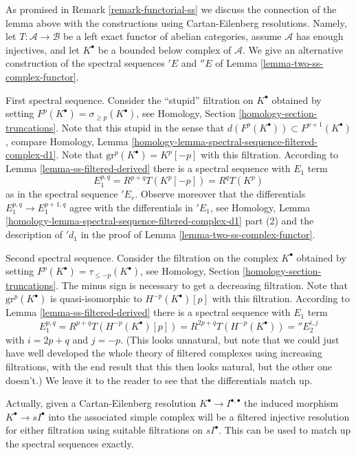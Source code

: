 \begin{remark}
\label{remark-final-functorial}
As promised in Remark \ref{remark-functorial-ss} we discuss the connection
of the lemma above with the constructions using Cartan-Eilenberg resolutions.
Namely, let $T : \mathcal{A} \to \mathcal{B}$ be a left exact functor
of abelian categories, assume $\mathcal{A}$
has enough injectives, and let $K^\bullet$ be a bounded below complex
of $\mathcal{A}$. We give an alternative construction of the
spectral sequences ${}'E$ and ${}''E$ of
Lemma \ref{lemma-two-ss-complex-functor}.

\medskip\noindent
First spectral sequence. Consider the ``stupid'' filtration on $K^\bullet$
obtained by setting $F^p(K^\bullet) = \sigma_{\geq p}(K^\bullet)$, see
Homology, Section \ref{homology-section-truncations}.
Note that this stupid in the sense that
$d(F^p(K^\bullet)) \subset F^{p + 1}(K^\bullet)$, compare
Homology, Lemma \ref{homology-lemma-spectral-sequence-filtered-complex-d1}.
Note that $\text{gr}^p(K^\bullet) = K^p[-p]$ with this filtration.
According to Lemma \ref{lemma-ss-filtered-derived} there is a spectral sequence
with $E_1$ term
$$
E_1^{p, q} = R^{p + q}T(K^p[-p]) = R^qT(K^p)
$$
as in the spectral sequence ${}'E_r$. Observe moreover that the differentials
$E_1^{p, q} \to E_1^{p + 1, q}$ agree with the differentials in $'{}E_1$, see
Homology, Lemma
\ref{homology-lemma-spectral-sequence-filtered-complex-d1} part (2)
and the description of ${}'d_1$ in the proof of
Lemma \ref{lemma-two-ss-complex-functor}.

\medskip\noindent
Second spectral sequence. Consider the filtration on the complex $K^\bullet$
obtained by setting $F^p(K^\bullet) = \tau_{\leq -p}(K^\bullet)$, see
Homology, Section \ref{homology-section-truncations}.
The minus sign is necessary
to get a decreasing filtration. Note that
$\text{gr}^p(K^\bullet)$ is quasi-isomorphic to $H^{-p}(K^\bullet)[p]$
with this filtration. According to Lemma \ref{lemma-ss-filtered-derived}
there is a spectral sequence with $E_1$ term
$$
E_1^{p, q} = R^{p + q}T(H^{-p}(K^\bullet)[p])
= R^{2p + q}T(H^{-p}(K^\bullet)) = {}''E_2^{i, j}
$$
with $i = 2p + q$ and $j = -p$. (This looks unnatural, but note that we
could just have well developed the whole theory of filtered complexes
using increasing filtrations, with the end result that this then looks
natural, but the other one doesn't.) We leave it to the reader to see
that the differentials match up.

\medskip\noindent
Actually, given a Cartan-Eilenberg resolution
$K^\bullet \to I^{\bullet, \bullet}$ the induced morphism
$K^\bullet \to sI^\bullet$ into the associated simple complex
will be a filtered injective resolution for either filtration
using suitable filtrations on $sI^\bullet$. This can be used
to match up the spectral sequences exactly.
\end{remark}






